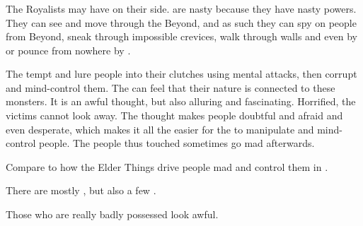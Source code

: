 \subsubsection{\Banes}
The Royalists may have \banes on their side. 
\Banes are nasty because they have nasty powers. 
They can see and move through the Beyond, and as such they can spy on people from Beyond, sneak through impossible crevices, walk through walls and even  by  or pounce from nowhere by .

The \banes tempt and lure people into their clutches using mental attacks, then corrupt and mind-control them. 
The \humans can feel that their nature is connected to these monsters. 
It is an awful thought, but also alluring and fascinating. 
Horrified, the victims cannot look away. 
The thought makes people doubtful and afraid and even desperate, which makes it all the easier for the \banes to manipulate and mind-control people. 
The people thus touched sometimes go mad afterwards. 

Compare to how the Elder Things drive people mad and control them in \cite{TimCurran:Hive}. 

There are mostly \lesserbanes, but also a few \greaterbanes. 

Those \humans who are really badly possessed look awful. 

